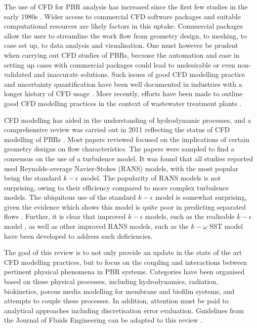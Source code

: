 \skippingparagraph
The use of CFD for PBR analysis has increased since the first few studies in the early 1980s \cite{patankar1980}. Wider access to commercial CFD software packages and suitable computational resources are likely factors in this uptake. Commercial packages allow the user to streamline the work flow from geometry design, to meshing, to case set up, to data analysis and visualisation. One must however be prudent when carrying out CFD studies of PBRs, because the automation and ease in setting up cases with commercial packages could lead to undesirable or even non-validated and inaccurate solutions. Such issues of good CFD modelling practice and uncertainty quantification have been well documented in industries with a longer history of CFD usage \cite{roache2002,oberkampf2002,celik2008,pelletier2010}.  More recently, efforts have been made to outline good CFD modelling practices in the context of wastewater treatment plants \cite{wicklein2016}.
\skippingparagraph

CFD modelling has aided in the understanding of hydrodynamic processes, and a comprehensive review was carried out in 2011 reflecting the status of CFD modelling of PBRs \cite{bitog2011}. Most papers reviewed focused on the implications of certain geometry designs on flow characteristics. The papers were sampled to find a consensus on the use of a turbulence model. It was found that all studies reported used Reynolds-average Navier-Stokes (RANS) models, with the most popular being the standard $k-\epsilon$ model. The popularity of RANS models is not surprising, owing to their efficiency compared to more complex turbulence models.  The ubiquitous use of the standard $k-\epsilon$ model is somewhat surprising, given the evidence which shows this model is quite poor in predicting separated flows \cite{menter2003}. Further, it is clear that improved $k-\epsilon$ models, such as the realisable $k-\epsilon$ model \cite{shih1995}, as well as other improved RANS models, such as the $k-\omega$  SST model \cite{menter1994,menter2003} have been developed to address such deficiencies.
\skippingparagraph

The goal of this review is to not only provide an update in the state of the art CFD modelling practices, but to focus on the coupling and interactions between pertinent physical phenomena in PBR systems. Categories have been organised based on these physical processes, including hydrodynamics, radiation, biokinetics, porous media modelling for membrane and biofilm systems, and attempts to couple these processes. In addition, attention must be paid to analytical approaches including discretisation error evaluation. Guidelines from the Journal of Fluids Engineering can be adapted to this review \cite{celik2008}.
\skippingparagraph

